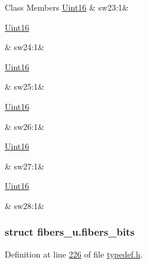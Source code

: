 \begin{DoxyFields}{Class Members}
\hypertarget{a00001_a26dd5bee34020f0e4a85a85e1f65a887}{\hyperlink{a00001_aae7407b021d43f7193a81a58cfb3e297}{Uint16}}\label{a00001_a26dd5bee34020f0e4a85a85e1f65a887}
&
sw23\+:1&
\\
\hline

\hypertarget{a00001_a8db7bb04efb5670cd70e862cf525088c}{\hyperlink{a00001_aae7407b021d43f7193a81a58cfb3e297}{Uint16}}\label{a00001_a8db7bb04efb5670cd70e862cf525088c}
&
sw24\+:1&
\\
\hline

\hypertarget{a00001_a478fed8879764c2f1e5b2eab34d90c00}{\hyperlink{a00001_aae7407b021d43f7193a81a58cfb3e297}{Uint16}}\label{a00001_a478fed8879764c2f1e5b2eab34d90c00}
&
sw25\+:1&
\\
\hline

\hypertarget{a00001_a9e6df30f137f22c02e0e96755f3fbb85}{\hyperlink{a00001_aae7407b021d43f7193a81a58cfb3e297}{Uint16}}\label{a00001_a9e6df30f137f22c02e0e96755f3fbb85}
&
sw26\+:1&
\\
\hline

\hypertarget{a00001_ad493545be9f1e360bff296457e578ec7}{\hyperlink{a00001_aae7407b021d43f7193a81a58cfb3e297}{Uint16}}\label{a00001_ad493545be9f1e360bff296457e578ec7}
&
sw27\+:1&
\\
\hline

\hypertarget{a00001_a70adef8b198f943738410021b784db75}{\hyperlink{a00001_aae7407b021d43f7193a81a58cfb3e297}{Uint16}}\label{a00001_a70adef8b198f943738410021b784db75}
&
sw28\+:1&
\\
\hline

\end{DoxyFields}
\label{d1/d6e/a00073}
\hypertarget{a00001_d1/d6e/a00073}{}
\subsubsection{struct fibers\+\_\+u.\+fibers\+\_\+bits}


Definition at line \hyperlink{a00001_source_l00226}{226} of file \hyperlink{a00001_source}{typedef.\+h}.



